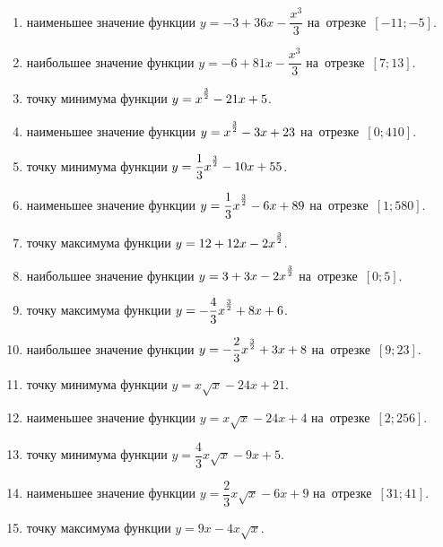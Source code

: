 \documentclass[a4paper,10pt]{article}
\begin{document}
\begin{enumerate}
\item {} наименьшее значение функции $y=-3 +36x-\dfrac{x^3}{3}$ на~отрезке~$\left[-11;-5\right]$.

\item {} наибольшее значение функции $y=-6 +81x-\dfrac{x^3}{3}$ на~отрезке~$\left[7;13\right]$.

\item {} точку минимума функции $y=x\strut^{\frac{3}{2}} -21x+5$.

\item {} наименьшее значение функции $y=x\strut^{\frac{3}{2}} -3x+23$ на~отрезке~$\left[0;410\right]$.

\item {} точку минимума функции $y=\dfrac{1}{3}x\strut^{\frac{3}{2}} -10x+55$.

\item {} наименьшее значение функции $y=\dfrac{1}{3}x\strut^{\frac{3}{2}} -6x+89$ на~отрезке~$\left[1;580\right]$.

\item {} точку максимума функции $y=12+12x-2x\strut^{\frac{3}{2}}$.

\item {} наибольшее значение функции $y=3+3x-2x\strut^{\frac{3}{2}}$ на~отрезке~$\left[0;5\right]$.

\item {} точку максимума функции $y=-\dfrac{4}{3}x\strut^{\frac{3}{2}} +8x+6$.

\item {} наибольшее значение функции $y=-\dfrac{2}{3}x\strut^{\frac{3}{2}} +3x+8$ на~отрезке~$\left[9;23\right]$.

\item {} точку минимума функции $y=x\sqrt{x} -24x+21$.

\item {} наименьшее значение функции $y=x\sqrt{x} -24x+4$ на~отрезке~$\left[2;256\right]$.

\item {} точку минимума функции $y=\dfrac{4}{3}x\sqrt{x} -9x+5$.

\item {} наименьшее значение функции $y=\dfrac{2}{3}x\sqrt{x} -6x+9$ на~отрезке~$\left[31;41\right]$.

\item {} точку максимума функции $y=9x -4x\sqrt{x}$.


\end{enumerate}
\end{document}
